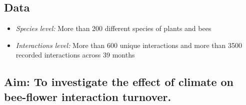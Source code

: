 \documentclass[20pt,margin=5mm, innermargin=6mm, blockverticalspace=6mm, colspace=6mm]{tikzposter}
\begin{document}
{\begin{minipage}[]{0.57\linewidth}
  \end{minipage}   
  \hspace{.8cm}    
  \begin{minipage}[]{0.40\linewidth}
     \vspace{-15pt}
   \subsection*{Data}
    \begin{itemize}[itemsep=5pt,topsep=0pt,parsep=0pt,partopsep=0pt, leftmargin=20pt]
    \item \textit {Species level:} More than 200 different species of plants and bees
    \item \textit{Interactions level:} More than 600 unique interactions and more than 3500 recorded interactions across 39 months
    \end {itemize}
    \end{minipage}

    \subsection*{\centering Aim: \normalfont To investigate the effect of climate on bee-flower interaction turnover.} 
 }

\end{document}
